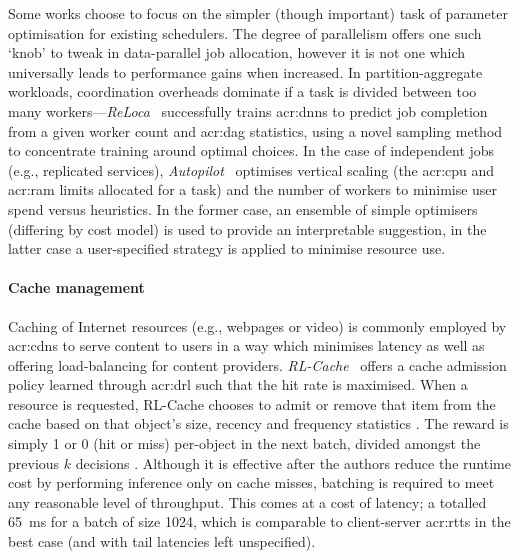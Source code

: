 Some works choose to focus on the simpler (though important) task of parameter optimisation for existing schedulers.
The degree of parallelism offers one such `knob' to tweak in data-parallel job allocation, however it is not one which universally leads to performance gains when increased.
In partition-aggregate workloads, coordination overheads dominate if a task is divided between too many workers---\emph{ReLoca}~\parencite{DBLP:conf/infocom/HuLZC20} successfully trains \glspl{acr:dnn} to predict job completion from a given worker count and \gls{acr:dag} statistics, using a novel sampling method to concentrate training around optimal choices.
In the case of independent jobs (e.g., replicated services), \emph{Autopilot}~\parencite{DBLP:conf/eurosys/RzadcaFSZBKNSWH20} optimises vertical scaling (the \gls{acr:cpu} and \gls{acr:ram} limits allocated for a task) and the number of workers to minimise user spend versus heuristics.
In the former case, an ensemble of simple optimisers (differing by cost model) is used to provide an interpretable suggestion, in the latter case a user-specified strategy is applied to minimise resource use.

\paragraph{Cache management}
Caching of Internet resources (e.g., webpages or video) is commonly employed by \glspl{acr:cdn} to serve content to users in a way which minimises latency as well as offering load-balancing for content providers.
\emph{RL-Cache}~\parencite{DBLP:journals/jsac/KirilinSGS20} offers a cache admission policy learned through \gls{acr:drl} such that the hit rate is maximised.
When a resource is requested, RL-Cache chooses to admit or remove that item from the cache \prllitact{} based on that object's size, recency and frequency statistics \prllitstate.
The reward is simply 1 or 0 (hit or miss) per-object in the next batch, divided amongst the previous $k$ decisions \prllitreward.
Although it is effective after the authors reduce the runtime cost by performing inference only on cache misses, batching is required to meet any reasonable level of throughput.
This comes at a cost of latency; a totalled \qty{65}{\milli\second} for a batch of size \num{1024}, which is comparable to client-server \glspl{acr:rtt} in the best case (and with tail latencies left unspecified).

